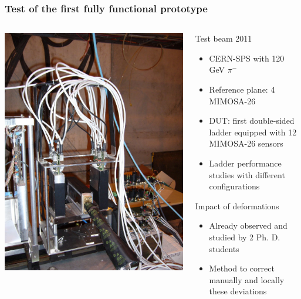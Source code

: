 \documentclass{beamer}
\begin{document}
  \begin{frame}
    \frametitle{Test of the first fully functional prototype}

    \vspace{-0.5cm}
    \begin{columns}[t]
      \begin{column}{4cm}
        \begin{center}
          \includegraphics[width = 4 cm]{Pictures/plume_testBeam_nov2011.jpg}
        \end{center}
      \end{column}

      \begin{column}{7cm}
        \begin{block}{Test beam 2011}
          \footnotesize{
          \begin{itemize}
            \item CERN-SPS with 120 GeV $\pi^{-}$
            \item Reference plane: 4 MIMOSA-26
            \item DUT: first double-sided ladder equipped with 12 MIMOSA-26 sensors
            \item Ladder performance studies with different configurations
          \end{itemize}
          }
        \end{block}

        \vspace{-0.3cm}
        \begin{block}{Impact of deformations}
          \footnotesize{
          \begin{itemize}
            \item Already observed and studied by 2 Ph. D. students
            \item Method to correct manually and locally these deviations
          \end{itemize}
          }
        \end{block}
      \end{column}
    \end{columns}
          

  \end{frame}
\end{document}
